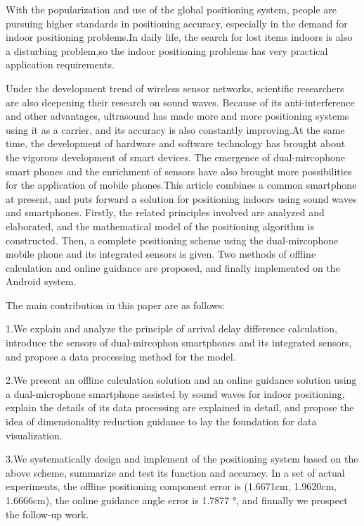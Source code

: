 \documentclass[winfonts,oneside]{njuthesis}
\begin{document}
\begin{englishabstract}
	
	With the popularization and use of the global positioning system, people are pursuing higher standards in positioning accuracy, especially in the demand for indoor positioning problems.In daily life, the search for lost items indoors is also a disturbing problem,so the indoor positioning problems has very practical application requirements.
		
	Under the development trend of wireless sensor networks, scientific researchers are also deepening their research on sound waves. Because of its anti-interference and other advantages, ultrasound has made more and more positioning systems using it as a carrier, and its accuracy is also constantly improving.At the same time, the development of hardware and software technology has brought about the vigorous development of smart devices. The emergence of dual-mircophone smart phones and the enrichment of sensors have also brought more possibilities for the application of mobile phones.This article combines a common smartphone at present, and puts forward a solution for positioning indoors using sound waves and smartphones. Firstly, the related principles involved are analyzed and elaborated, and the mathematical model of the positioning algorithm is constructed. Then, a complete positioning scheme using the dual-mircophone mobile phone and its integrated sensors is given. Two methods of offline calculation and online guidance are proposed, and finally implemented on the Android system.

	The main contribution in this paper are as follows: 
	
	1.We explain and analyze the principle of arrival delay difference calculation, introduce the sensors of dual-mircophon smartphones and its integrated sensors, and propose a data processing method for the model.
	
	2.We present an offline calculation solution and an online guidance solution using a dual-microphone smartphone assisted by sound waves for indoor positioning, explain the details of its data processing are explained in detail, and propose the idea of dimensionality reduction guidance to lay the foundation for data visualization.
	
	3.We systematically design and implement of the positioning system based on the above scheme, summarize and test its function and accuracy. In a set of actual experiments, the offline positioning component error is (1.6671cm, 1.9620cm, 1.6666cm), the online guidance angle error is 1.7877 °, and finnally we prospect the follow-up work.

\end{englishabstract}
\end{document}
